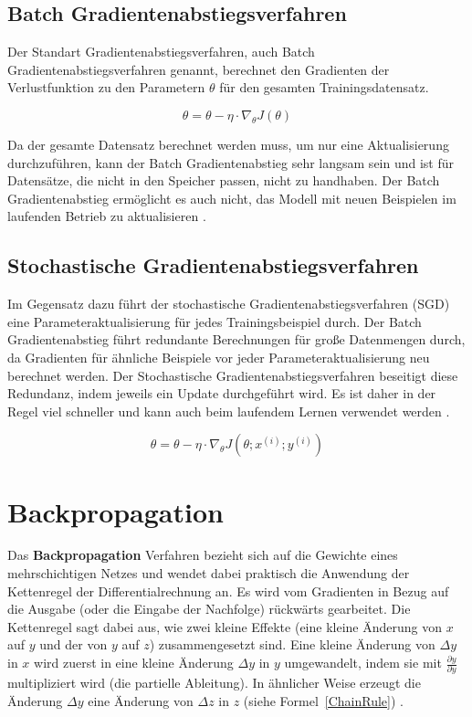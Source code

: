         \subsection{Batch Gradientenabstiegsverfahren}
        Der Standart Gradientenabstiegsverfahren, auch Batch Gradientenabstiegsverfahren genannt, berechnet den Gradienten der Verlustfunktion zu den Parametern $\theta$ für den gesamten Trainingsdatensatz.


        \begin{equation} \label{FormelGradBatch}
            \theta = \theta - \eta \cdot \nabla_{\theta}J(\theta)
        \end{equation}

        Da der gesamte Datensatz berechnet werden muss, um nur eine Aktualisierung durchzuführen, kann der Batch Gradientenabstieg sehr langsam sein und ist für Datensätze, die nicht in den Speicher passen, nicht zu handhaben. Der Batch Gradientenabstieg ermöglicht es auch nicht, das Modell mit neuen Beispielen im laufenden Betrieb zu aktualisieren \cite*{Ruder2016}.

        \subsection{Stochastische Gradientenabstiegsverfahren}

        Im Gegensatz dazu führt der stochastische Gradientenabstiegsverfahren (SGD) eine Parameteraktualisierung für jedes Trainingsbeispiel durch. Der Batch Gradientenabstieg führt redundante Berechnungen für große Datenmengen durch, da Gradienten für ähnliche Beispiele vor jeder Parameteraktualisierung neu berechnet werden. Der Stochastische Gradientenabstiegsverfahren beseitigt diese Redundanz, indem jeweils ein Update durchgeführt wird. Es ist daher in der Regel viel schneller und kann auch beim laufendem Lernen verwendet werden \cite*{Ruder2016}.

        \begin{equation} \label{FormelGradStoch}
            \theta = \theta - \eta \cdot \nabla_{\theta}J(\theta;x^{(i)};y^{(i)})
        \end{equation}



        \section{Backpropagation}
        Das \textbf{Backpropagation} Verfahren bezieht sich auf die Gewichte eines mehrschichtigen Netzes und wendet dabei praktisch die Anwendung der Kettenregel der  Differentialrechnung an. Es wird vom Gradienten in Bezug auf die Ausgabe (oder die Eingabe der Nachfolge) rückwärts gearbeitet. Die Kettenregel sagt dabei aus, wie zwei kleine Effekte (eine kleine Änderung von $x$ auf $y$ und der von $y$ auf $z$) zusammengesetzt sind. Eine kleine Änderung von $\Delta y$ in $x$ wird zuerst in eine kleine Änderung $\Delta y$ in $y$ umgewandelt, indem sie mit $\frac{\partial y}{\partial y}$  multipliziert wird (die partielle Ableitung). In ähnlicher Weise erzeugt die Änderung $\Delta y$ eine Änderung von $\Delta z$ in $z$ (siehe Formel~\ref{ChainRule}) \cite*{Lecun2015}.

